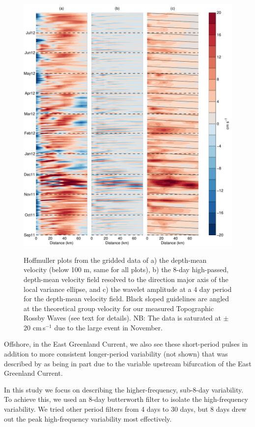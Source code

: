 \documentclass[12pt,titlepage,figuresatend]{article}
\begin{document}
\begin{figure}[p!]
  \centering\includegraphics[width=\hsize]{./figures/hoff_vars.pdf}
  \caption{Hoffmuller plots from the gridded data of a) the depth-mean velocity (below 100 m, same for all plots), b) the 8-day high-passed, depth-mean velocity field resolved to the direction major axis of the local variance ellipse, and c) the wavelet amplitude at a 4 day period for the depth-mean velocity field. Black sloped guidelines are angled at the theoretical group velocity for our measured Topographic Rossby Waves (see text for details). NB: The data is saturated at $\pm$20 cm$\,$s$^{-1}$  due to the large event in November.}{\label{fig_hoff}}
\end{figure}

Offshore, in the East Greenland Current, we also see these short-period pulses in addition to more consistent longer-period variability (not shown) that was described by \cite{Harden2016} as being in part due to the variable upstream bifurcation of the East Greenland Current.

In this study we focus on describing the higher-frequency, sub-8-day variability. To achieve this, we used an 8-day butterworth filter to isolate the high-frequency variability. We tried other period filters from 4 days to 30 days, but 8 days drew out the peak high-frequency variability most effectively.
\end{document}
